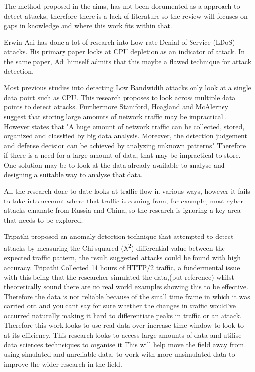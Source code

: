 The method proposed in the aims, has not been documented as a approach to detect attacks, therefore there is a lack of literature so the review will focuses on gaps in knowledge and where this work fits within that.


Erwin Adi has done a lot of research into Low-rate Denial of Service (LDoS) attacks. His primary paper looks at CPU depletion as an indicator of attack. In the same paper, Adi himself admits that this maybe a flawed technique for attack detection. \cite{Adi2016} 

Most previous studies into detecting Low Bandwidth attacks only look at a single data point such as CPU. This research proposes to look across multiple data points to detect attacks. Furthermore Staniford, Hoagland and McAlerney suggest that storing large amounts of network traffic may be impractical \cite{staniford2002practical}. However \citeauthor{9016229} states that "A huge amount of network traffic can be collected, stored, organized and classified by big data analysis. Moreover, the detection judgement and defense decision can be achieved by analyzing unknown patterns" \cite{9016229} Therefore if there is a need for a large amount of data, that may be impractical to store. One solution may be to look at the data already available to analyse and designing a suitable way to analyse that data.

All the research done to date looks at traffic flow in various ways, however it fails to take into account where that traffic is coming from, for example, most cyber attacks emanate from Russia and China, so the research is ignoring a key area that needs to be explored.

Tripathi proposed an anomaly detection technique that attempted to detect attacks by measuring the Chi squared (X\textsuperscript{\small2}) differential value between the expected traffic pattern, the result suggested attacks could be found with high accuracy. Tripathi Collected 14 hours of HTTP/2 traffic, a fundermental issue with this being that the researcher simulated the data,(put reference) whilst theoretically sound there are no real world examples showing this to be effective. Therefore the data is not reliable because of the small time frame in which it was carried out and you cant say for sure whether the changes in traffic would've occurred naturally making it hard to differentiate peaks in traffic or an attack. Therefore this work looks to use real data over increase time-window to look to at its efficiency. This research looks to access large amounts of data and utilise data sciences techneiques to organise it This will help move the field away from using simulated and unreliable data, to work with more unsimulated data to improve the wider research in the field. 

